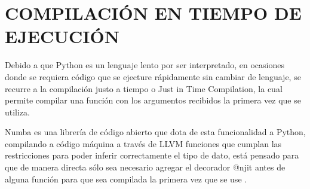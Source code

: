 \section{COMPILACIÓN EN TIEMPO DE EJECUCIÓN}
	Debido a que Python es un lenguaje lento por ser interpretado, en ocasiones donde se requiera código que se ejecture rápidamente sin cambiar de lenguaje, se recurre a la compilación justo a tiempo o Just in Time Compilation, la cual permite compilar una función con los argumentos recibidos la primera vez que se utiliza.
	
	Numba es una librería de código abierto que dota de esta funcionalidad a Python, compilando a código máquina a través de LLVM funciones que cumplan las restricciones para poder inferir correctamente el tipo de dato, está pensado para que de manera directa sólo sea necesario agregar el decorador @njit antes de alguna función para que sea compilada la primera vez que se use \citep{numba}.